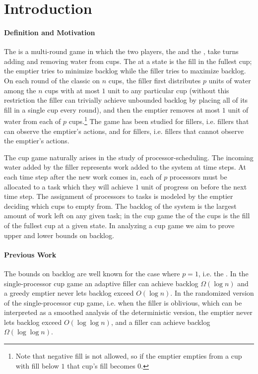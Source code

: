 \section{Introduction}\label{sec:intro}
\paragraph{Definition and Motivation}
The  is a multi-round game in which the two players, the
 and the , take turns adding and removing water
from cups. The  at a state is the fill in the
fullest cup; the emptier tries to minimize backlog while the
filler tries to maximize backlog.
On each round of the classic  on $n$
cups, the filler first distributes $p$ units of water among
the $n$ cups with at most $1$ unit to any particular cup (without this
restriction the filler can trivially achieve unbounded backlog by placing all
of its fill in a single cup every round), and then the emptier 
removes at most $1$ unit of water from each of $p$ cups.\footnote{Note that negative
fill is not allowed, so if the emptier empties from a cup with fill below $1$
that cup's fill becomes $0$.} The game has been studied for 
fillers, i.e. fillers that can observe the emptier's actions, and for
 fillers, i.e. fillers that cannot observe the emptier's actions.

The cup game naturally arises in the study of processor-scheduling. The
incoming water added by the filler represents work added to the system at time
steps. At each time step after the new work comes in, each of $p$ processors
must be allocated to a task which they will achieve $1$ unit of progress on
before the next time step. The assignment of processors to tasks is modeled by
the emptier deciding which cups to empty from. The backlog of the system is the
largest amount of work left on any given task; in the cup game the
 of the cups is the fill of the fullest cup at a given state. In
analyzing a cup game we aim to prove upper and lower bounds on backlog.

\paragraph{Previous Work}
The bounds on backlog are well known for the case where $p=1$, i.e. the
.
In the single-processor cup game an adaptive filler can achieve backlog
$\Omega(\log n)$ and a greedy emptier never lets backlog exceed $O(\log n)$. In
the randomized version of the single-processor cup game, i.e. when the filler
is oblivious, which can be interpreted as a smoothed analysis of the
deterministic version, the emptier never lets backlog exceed $O(\log \log n)$,
and a filler can achieve backlog $\Omega(\log\log n)$.

